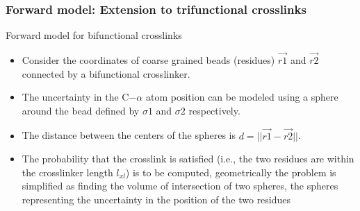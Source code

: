 \documentclass[a4paper,8pt]{beamer}
\begin{document}
\begin{frame}
    \frametitle{Forward model: Extension to trifunctional crosslinks}
    \begin{block}{}
        Forward model for bifunctional crosslinks 
        \begin{itemize}
            \item Consider the coordinates of coarse grained beads (residues) $\vec{r1}$ and $\vec{r2}$ connected by a bifunctional crosslinker.
            \item The uncertainty in the C$-\alpha$ atom position can be modeled using a sphere around the bead defined by $\sigma1$ and
            $\sigma2$ respectively.
            \item The distance between the centers of the spheres is $d = ||\vec{r1} - \vec{r2}||$.
            \item The probability that the crosslink is satisfied (i.e., the two residues are within the crosslinker length 
            $l_{xl}$) is to be computed, geometrically the problem is simplified as finding the volume of intersection of two spheres,
            the spheres representing the uncertainty in the position of the two residues        
        \end{itemize}

        \end{block}
\end{frame}
\end{document}
